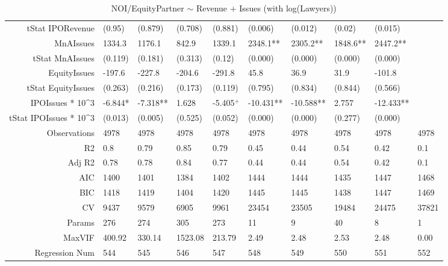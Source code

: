 \begin{table}[ht]
\begin{tabular}{rlllllllll}
  tStat IPORevenue & (0.95) & (0.879) & (0.708) & (0.881) & (0.006) & (0.012) & (0.02) & (0.015) &  \\ 
  MnAIssues & 1334.3 & 1176.1 & 842.9 & 1339.1 & 2348.1** & 2305.2** & 1848.6** & 2447.2** &  \\ 
  tStat MnAIssues & (0.119) & (0.181) & (0.313) & (0.12) & (0.000) & (0.000) & (0.000) & (0.000) &  \\ 
  EquityIssues & -197.6 & -227.8 & -204.6 & -291.8 & 45.8 & 36.9 & 31.9 & -101.8 &  \\ 
  tStat EquityIssues & (0.263) & (0.216) & (0.173) & (0.119) & (0.795) & (0.834) & (0.844) & (0.566) &  \\ 
  IPOIssues * 10^3 & -6.844* & -7.318** & 1.628 & -5.405$^{+}$ & -10.431** & -10.588** & 2.757 & -12.433** &  \\ 
  tStat IPOIssues * 10^3 & (0.013) & (0.005) & (0.525) & (0.052) & (0.000) & (0.000) & (0.277) & (0.000) &  \\ 
  Observations & 4978 & 4978 & 4978 & 4978 & 4978 & 4978 & 4978 & 4978 & 4978 \\ 
  R2 & 0.8 & 0.79 & 0.85 & 0.79 & 0.45 & 0.44 & 0.54 & 0.42 & 0.1 \\ 
  Adj R2 & 0.78 & 0.78 & 0.84 & 0.77 & 0.44 & 0.44 & 0.54 & 0.42 & 0.1 \\ 
  AIC & 1400 & 1401 & 1384 & 1402 & 1444 & 1444 & 1435 & 1447 & 1468 \\ 
  BIC & 1418 & 1419 & 1404 & 1420 & 1445 & 1445 & 1438 & 1447 & 1469 \\ 
  CV & 9437 & 9579 & 6905 & 9961 & 23454 & 23505 & 19484 & 24475 & 37821 \\ 
  Params & 276 & 274 & 305 & 273 & 11 & 9 & 40 & 8 & 1 \\ 
  MaxVIF & 400.92 & 330.14 & 1523.08 & 213.79 & 2.49 & 2.48 & 2.53 & 2.48 & 0.00 \\ 
  Regression Num & 544 & 545 & 546 & 547 & 548 & 549 & 550 & 551 & 552 \\ 
   \hline
\end{tabular}
\caption{NOI/EquityPartner $\sim$ Revenue + Issues (with log(Lawyers))} 
\end{table}
